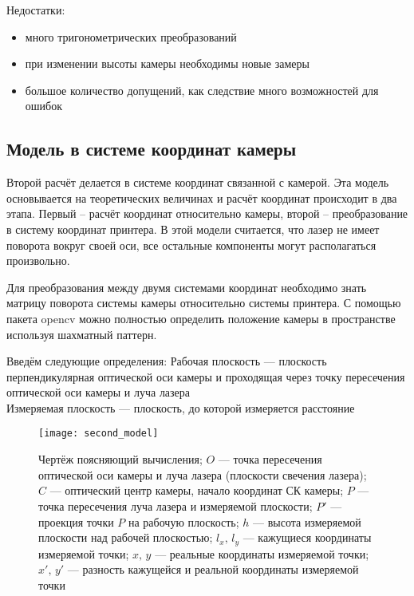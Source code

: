             Недостатки:
            \begin{itemize}
                \item много тригонометрических преобразований
                \item при изменении высоты камеры необходимы новые замеры
                \item большое количество допущений, как следствие много возможностей для ошибок
            \end{itemize}

        \subsection{Модель в системе координат камеры}
            Второй расчёт делается в системе координат связанной с камерой. Эта модель основывается на теоретических величинах и расчёт координат происходит в два этапа. Первый -- расчёт координат относительно камеры, второй -- преобразование в систему координат принтера. В этой модели считается, что лазер не имеет поворота вокруг своей оси, все остальные компоненты могут располагаться произвольно.
            
            Для преобразования между двумя системами координат необходимо знать матрицу поворота системы камеры относительно системы принтера. С помощью пакета opencv можно полностью определить положение камеры в пространстве используя шахматный паттерн.

            Введём следующие определения:
            Рабочая плоскость --- плоскость перпендикулярная оптической оси камеры и проходящая через точку пересечения оптической оси камеры и луча лазера\\
            Измеряемая плоскость --- плоскость, до которой измеряется расстояние 

            \begin{figure}[H]
                \centering
                \texttt{[image: second\_model]}
                \caption{Чертёж поясняющий вычисления;
                         $O$ --- точка пересечения оптической оси камеры и луча лазера (плоскости свечения лазера);
                         $C$ --- оптический центр камеры, начало координат СК камеры;
                         $P$ --- точка пересечения луча лазера и измеряемой плоскости;
                         $P'$ --- проекция точки $ P $ на рабочую плоскость;
                         $h$ --- высота измеряемой плоскости над рабочей плоскостью;
                         $l_x,\,l_y$ --- кажущиеся координаты измеряемой точки;
                         $x,\,y$ --- реальные координаты измеряемой точки;
                         $x',\,y'$ --- разность кажущейся и реальной координаты измеряемой точки}
                 \label{pic:second_model}
            \end{figure}
            
